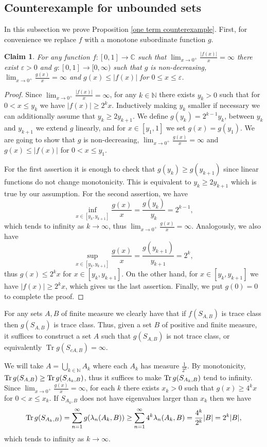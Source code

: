 \documentclass[12pt]{amsart}
\numberwithin{equation}{section}
\newcommand{\N}{\mathbb{N}}
\newcommand{\Cm}{\mathbb{C}}
\newcommand{\eps}{\varepsilon}
\newtheorem{claim}[Thm]{Claim}
\begin{document}
\subsection{Counterexample for unbounded sets}
In this subsection we prove Proposition \ref{one term counterexample}. First, for convenience we replace $f$ with a monotone subordinate function $g$.
\begin{claim}
For any function $f:[0,1]\to \Cm$ such that $\lim_{x\to 0^+} \frac{|f(x)|}{x} = \infty$ there exist $\eps > 0$ and $g:[0,1]\to [0, \infty)$ such that $g$ is non-decreasing, $\lim_{x\to 0^+} \frac{g(x)}{x} = \infty$ and $g(x)\le |f(x)|$ for $0 \le x 
\le\eps$.
\end{claim}
\begin{proof}
Since $\lim_{x\to 0^+} \frac{|f(x)|}{x} = \infty$, for any $k\in \N$ there exists $y_k > 0$ such that for $0 < x \le y_k$ we have $|f(x)| \ge 2^k x$. Inductively making $y_k$ smaller if necessary we can additionally assume that $y_k \ge 2 y_{k+1}$. We define $g(y_k) = 2^{k-1}y_k$, between $y_k$ and $y_{k+1}$ we extend $g$ linearly, and for $x\in [y_1, 1]$ we set $g(x) = g(y_1)$. We are going to show that $g$ is non-decreasing, $\lim_{x\to 0^+} \frac{g(x)}{x} = \infty$ and $g(x)\le |f(x)|$ for $0 < x \le y_1$.

For the first assertion it is enough to check that $g(y_k) \ge g(y_{k+1})$ since linear functions do not change monotonicity. This is equivalent to $y_k \ge 2y_{k+1}$ which is true by our assumption. For the second assertion, we have $$\inf_{x\in [y_k, y_{k+1}]} \frac{g(x)}{x} = \frac{g(y_k)}{y_k}=2^{k-1},$$
which tends to infinity as $k \to \infty$, thus $\lim_{x\to 0^+} \frac{g(x)}{x} = \infty$. Analogously, we also have 
$$\sup_{x\in [y_k, y_{k+1}]} \frac{g(x)}{x} = \frac{g(y_{k+1})}{y_{k+1}}=2^{k},$$
thus $g(x) \le 2^{k}x$ for $x\in [y_k, y_{k+1}]$. On the other hand, for $x\in [y_k, y_{k+1}]$ we have $|f(x)| \ge 2^k x$, which gives us the last assertion. Finally, we put $g(0) = 0$ to complete the proof.
\end{proof}
For any sets $A, B$ of finite measure we clearly have that if $f(S_{A,B})$ is trace class then $g(S_{A, B})$ is trace class. Thus, given a set $B$ of positive and finite measure, it suffices to construct a set $A$ such that $g(S_{A,B})$ is not trace class, or equivalently $\operatorname{Tr} g(S_{cA,B}) = \infty$.

We will take $A = \bigcup_{k\in \N} A_k$ where each $A_k$ has measure $\frac{1}{2^k}$. By monotonicity, ${\rm Tr}\,g(S_{A,B}) \ge {\rm Tr}\,g(S_{A_k, B})$, thus it suffices to make ${\rm Tr}\,g(S_{A_k, B})$ tend to infinity. Since $\lim_{x\to 0^+} \frac{g(x)}{x} = \infty$, for each $k$ there exists $x_k > 0$ such that $g(x) \ge 4^k x$ for $0 < x \le x_k$. If $S_{A_k, B}$ does not have eigenvalues larger than $x_k$ then we have
$${\rm Tr}\,g(S_{A_k, B}) = \sum_{n=1}^\infty g(\lambda_n(A_k, B)) \ge \sum_{n=1}^\infty 4^k \lambda_n(A_k, B) = \frac{4^k}{2^k}|B| = 2^k|B|,$$
which tends to infinity as $k\to \infty$.
\end{document}
